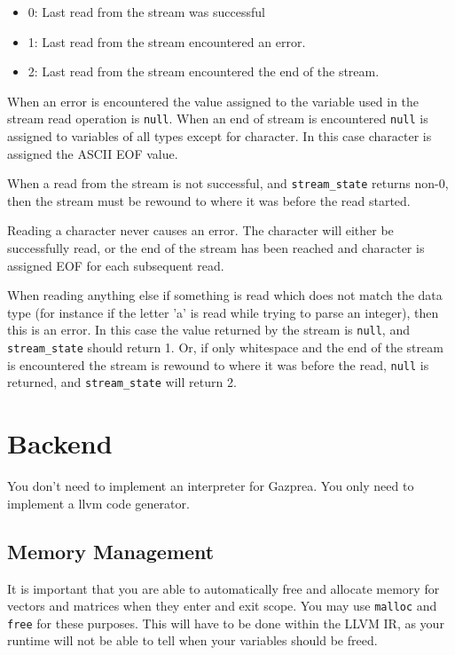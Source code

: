 \documentclass{article}
\begin{document}
    \begin{itemize}
      \item 0: Last read from the stream was successful
      \item 1: Last read from the stream encountered an error.
      \item 2: Last read from the stream encountered the end of the stream.
    \end{itemize}

    When an error is encountered the value assigned to the variable used in the stream read operation is
    \texttt{null}. When an end of stream is encountered \texttt{null} is assigned to variables of all types except
    for character. In this case character is assigned the ASCII EOF value.

    When a read from the stream is not successful, and \texttt{stream\_state} returns non-0, then the stream must be
    rewound to where it was before the read started.

    Reading a character never causes an error. The character will either be successfully read, or the end of the
    stream has been reached and character is assigned EOF for each subsequent read.

    When reading anything else if something is read which does not match the data type (for instance if the letter
    'a' is read while trying to parse an integer), then this is an error. In this case the value returned by the
    stream is \texttt{null}, and \texttt{stream\_state} should return 1. Or, if only whitespace and the end of the
    stream is encountered the stream is rewound to where it was before the read, \texttt{null} is returned, and
    \texttt{stream\_state} will return 2.


\section{Backend}

  You don't need to implement an interpreter for Gazprea. You only need to implement a llvm code generator.

  \subsection{Memory Management}\label{sec:memory}
     It is important that you are able to automatically free and allocate memory for vectors and matrices when they enter and exit scope.
     You may use \texttt{malloc} and \texttt{free} for these purposes. This will have to be done within the LLVM IR, as your runtime will
     not be able to tell when your variables should be freed.
\end{document}
